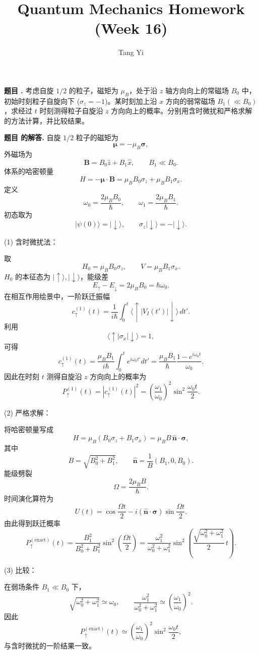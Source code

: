 \documentclass[12pt, a4paper, oneside]{ctexart}
\title{Quantum Mechanics Homework (Week 16)}
\author{Tang Yi \\ [学号已脱敏]}
\newcounter{problemname}
\newenvironment{problem}
  {\begin{shaded}\stepcounter{problemname}\par\noindent\textbf{题目 \theproblemname. }}
  {\end{shaded}\par}
\newenvironment{solution}
  {\par\noindent\textbf{题目 \theproblemname 的解答. }}
  {\par}
\begin{document}
\maketitle


\begin{problem}
  考虑自旋 $1/2$ 的粒子，磁矩为 $\mu_B$，处于沿 $z$ 轴方向向上的常磁场 $B_0$ 中，初始时刻粒子自旋向下 ($\sigma_z = -1$)。某时刻加上沿 $x$ 方向的弱常磁场 $B_1 (\ll B_0)$，求经过 $t$ 时刻测得粒子自旋沿 $z$ 方向向上的概率。分别用含时微扰和严格求解的方法计算，并比较结果。
\end{problem}

\begin{solution}
自旋 $1/2$ 粒子的磁矩为
\[
\boldsymbol{\mu}=-\mu_B\boldsymbol{\sigma},
\]
外磁场为
\[
\mathbf B = B_0\hat z + B_1\hat x,\qquad B_1\ll B_0.
\]
体系的哈密顿量
\[
H=-\boldsymbol{\mu}\cdot\mathbf B
=\mu_B B_0\sigma_z+\mu_B B_1\sigma_x .
\]
定义
\[
\omega_0=\frac{2\mu_B B_0}{\hbar},\qquad
\omega_1=\frac{2\mu_B B_1}{\hbar}.
\]
初态取为
\[
|\psi(0)\rangle=|\downarrow\rangle,\qquad
\sigma_z|\downarrow\rangle=-|\downarrow\rangle.
\]

(1) 含时微扰法：

取
\[
H_0=\mu_B B_0\sigma_z,\qquad
V=\mu_B B_1\sigma_x .
\]
$H_0$ 的本征态为 $|\uparrow\rangle,|\downarrow\rangle$，能级差
\[
E_\uparrow-E_\downarrow=2\mu_B B_0=\hbar\omega_0.
\]
在相互作用绘景中，一阶跃迁振幅
\[
c_\uparrow^{(1)}(t)
=\frac{1}{i\hbar}\int_0^t
\langle\uparrow|V_I(t')|\downarrow\rangle\,dt'.
\]
利用
\[
\langle\uparrow|\sigma_x|\downarrow\rangle=1,
\]
可得
\[
c_\uparrow^{(1)}(t)
=\frac{\mu_B B_1}{i\hbar}\int_0^t e^{i\omega_0 t'}dt'
=\frac{\mu_B B_1}{\hbar}\frac{1-e^{i\omega_0 t}}{\omega_0}.
\]
因此在时刻 $t$ 测得自旋沿 $z$ 方向向上的概率为
\[
P_{\uparrow}^{(1)}(t)
=|c_\uparrow^{(1)}(t)|^2
=\left(\frac{\omega_1}{\omega_0}\right)^2
\sin^2\frac{\omega_0 t}{2}.
\]

(2) 严格求解：

将哈密顿量写成
\[
H=\mu_B(B_0\sigma_z+B_1\sigma_x)
=\mu_B B\,\hat{\mathbf n}\cdot\boldsymbol{\sigma},
\]
其中
\[
B=\sqrt{B_0^2+B_1^2},\qquad
\hat{\mathbf n}=\frac{1}{B}(B_1,0,B_0).
\]
能级劈裂
\[
\Omega=\frac{2\mu_B B}{\hbar}.
\]
时间演化算符为
\[
U(t)=\cos\frac{\Omega t}{2}
-i(\hat{\mathbf n}\cdot\boldsymbol{\sigma})
\sin\frac{\Omega t}{2}.
\]
由此得到跃迁概率
\[
P_{\uparrow}^{(\mathrm{exact})}(t)
=\frac{B_1^2}{B_0^2+B_1^2}
\sin^2\!\left(\frac{\Omega t}{2}\right)
=\frac{\omega_1^2}{\omega_0^2+\omega_1^2}
\sin^2\!\left(
\frac{\sqrt{\omega_0^2+\omega_1^2}}{2}\,t
\right).
\]

(3) 比较：

在弱场条件 $B_1\ll B_0$ 下，
\[
\sqrt{\omega_0^2+\omega_1^2}\simeq\omega_0,\qquad
\frac{\omega_1^2}{\omega_0^2+\omega_1^2}
\simeq\left(\frac{\omega_1}{\omega_0}\right)^2.
\]
因此
\[
P_{\uparrow}^{(\mathrm{exact})}(t)
\simeq
\left(\frac{\omega_1}{\omega_0}\right)^2
\sin^2\frac{\omega_0 t}{2},
\]
与含时微扰的一阶结果一致。

\end{solution}
\end{document}
